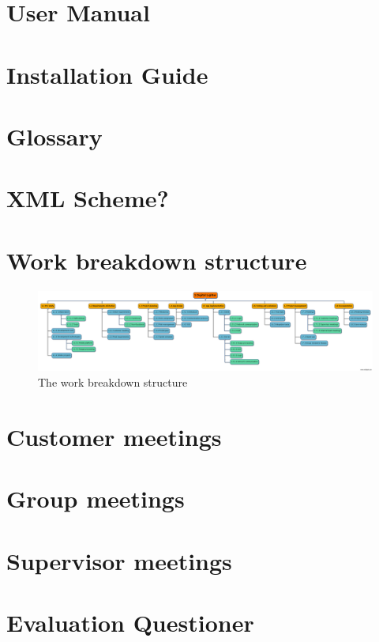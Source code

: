 \chapter{User Manual}

\chapter{Installation Guide}

\chapter{Glossary}

\chapter{XML Scheme?}

\chapter{Work breakdown structure} \label{txt:work_breakdown_structure}

\begin{figure}[!h]
	\centering
		\includegraphics[width=12cm, angle=90]{planning/wbs.png}
	\caption{The work breakdown structure}
	\label{fig:wbs}
\end{figure}

\chapter{Customer meetings}

\chapter{Group meetings}

\chapter{Supervisor meetings}

\chapter{Evaluation Questioner}